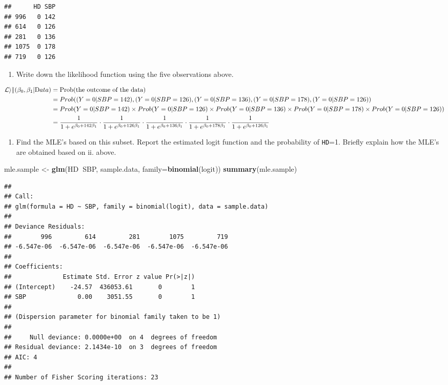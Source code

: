 \documentclass[]{article}
\newenvironment{Shaded}{\begin{snugshade}}{\end{snugshade}}
\newcommand{\KeywordTok}[1]{\textcolor[rgb]{0.13,0.29,0.53}{\textbf{#1}}}
\newcommand{\DataTypeTok}[1]{\textcolor[rgb]{0.13,0.29,0.53}{#1}}
\newcommand{\StringTok}[1]{\textcolor[rgb]{0.31,0.60,0.02}{#1}}
\newcommand{\OperatorTok}[1]{\textcolor[rgb]{0.81,0.36,0.00}{\textbf{#1}}}
\newcommand{\NormalTok}[1]{#1}
\providecommand{\tightlist}{%
  \setlength{\itemsep}{0pt}\setlength{\parskip}{0pt}}
\begin{document}
\begin{verbatim}
##      HD SBP
## 996   0 142
## 614   0 126
## 281   0 136
## 1075  0 178
## 719   0 126
\end{verbatim}

\begin{enumerate}
\def\labelenumi{\roman{enumi}.}
\setcounter{enumi}{1}
\tightlist
\item
  Write down the likelihood function using the five observations above.
\end{enumerate}

\[\begin{split}
\mathcal{Lik}(\beta_0, \beta_1 \vert {\text Data}) &= {\text {Prob(the outcome of the data)}}\\
&=Prob((Y=0|SBP=142), (Y=0|SBP=126), (Y=0|SBP=136), (Y=0|SBP=178), (Y=0|SBP=126)) \\
&=Prob(Y=0|SBP=142) \times Prob(Y=0|SBP=126) \times Prob(Y=0|SBP=136) \times Prob(Y=0|SBP=178) \times Prob(Y=0|SBP=126)) \\
&= \frac{1}{1+e^{\beta_0 + 142 \beta_1}}\cdot\frac{1}{1+e^{\beta_0 + 126\beta_1}}\cdot\frac{1}{1 + e^{\beta_0 + 136 \beta_1}}\cdot\frac{1}{1 + e^{\beta_0 + 178 \beta_1}}\cdot\frac{1}{1 + e^{\beta_0 + 126 \beta_1}}
    \end{split}\]

\begin{enumerate}
\def\labelenumi{\roman{enumi}.}
\setcounter{enumi}{2}
\tightlist
\item
  Find the MLE's based on this subset. Report the estimated logit
  function and the probability of \texttt{HD}=1. Briefly explain how the
  MLE's are obtained based on ii. above.
\end{enumerate}

\begin{Shaded}
\begin{Highlighting}[]
\NormalTok{mle.sample <-}\StringTok{ }\KeywordTok{glm}\NormalTok{(HD}\OperatorTok{~}\NormalTok{SBP, sample.data, }\DataTypeTok{family=}\KeywordTok{binomial}\NormalTok{(logit))}
\KeywordTok{summary}\NormalTok{(mle.sample)}
\end{Highlighting}
\end{Shaded}

\begin{verbatim}
## 
## Call:
## glm(formula = HD ~ SBP, family = binomial(logit), data = sample.data)
## 
## Deviance Residuals: 
##        996         614         281        1075         719  
## -6.547e-06  -6.547e-06  -6.547e-06  -6.547e-06  -6.547e-06  
## 
## Coefficients:
##              Estimate Std. Error z value Pr(>|z|)
## (Intercept)    -24.57  436053.61       0        1
## SBP              0.00    3051.55       0        1
## 
## (Dispersion parameter for binomial family taken to be 1)
## 
##     Null deviance: 0.0000e+00  on 4  degrees of freedom
## Residual deviance: 2.1434e-10  on 3  degrees of freedom
## AIC: 4
## 
## Number of Fisher Scoring iterations: 23
\end{verbatim}
\end{document}
